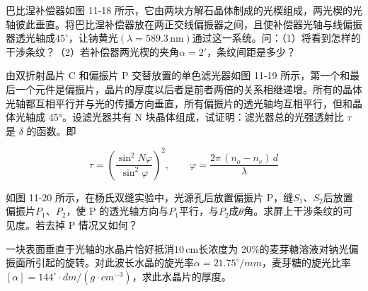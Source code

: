 \documentclass[padl, analysis, notocnum]{ExBook}
\newcommand{\answerarea}[1][3.5cm]{%
  \par\vspace{1mm}%
  \noindent{\color{themeColor!35}\rule{\linewidth}{0.4pt}}\par
  \noindent\begin{minipage}[t][#1][t]{\linewidth}\vspace{0pt}\end{minipage}\par
  \noindent{\color{themeColor!35}\rule{\linewidth}{0.4pt}}\par
}
\begin{document}
\begin{qitems}[startnum=9]
\qitem 巴比涅补偿器如图 11-18 所示，它由两块方解石晶体制成的光楔组成，两光楔的光轴彼此垂直。将巴比涅补偿器放在两正交线偏振器之间，且使补偿器光轴与线偏振器透光轴成$45^{\circ}$，让钠黄光$(\lambda =589.3\,\mathrm{nm})$通过这一系统。问：（1）将看到怎样的干涉条纹？（2）若补偿器两光楔的夹角$\alpha =2'$，条纹间距是多少？
\label{q:343:start}
\answerarea[2.4cm]
\label{q:343:end}
\end{qitems}

\begin{qitems}[startnum=10]
\qitem 由双折射晶片 C 和偏振片 P 交替放置的单色滤光器如图 11-19 所示，第一个和最后一个元件是偏振片，晶片的厚度以后者是前者两倍的关系相继递增。所有的晶体光轴都互相平行并与光的传播方向垂直，所有偏振片的透光轴均互相平行，但和晶体光轴成 45°。设滤光器共有 N 块晶体组成，试证明：滤光器总的光强透射比 $\tau$ 是 $\delta$ 的函数。即

\par\vspace{2mm}
\[
\tau=\left(\frac{\sin^{2}N\varphi}{\sin^{2}\varphi}\right)^{2},
\qquad
\varphi=\frac{2\pi\,(n_{o}-n_{e})\,d}{\lambda}
\]

\label{q:344:start}
\answerarea[2.4cm]
\label{q:344:end}
\end{qitems}

\begin{qitems}[startnum=11]
\qitem 如图 11-20 所示，在杨氏双缝实验中，光源孔后放置偏振片 P，缝$S_{1}$、$S_{2}$后放置偏振片$P_{1}$、$P_{2}$，使 P 的透光轴方向与$P_{1}$平行，与$P_{2}$成$\theta$角。求屏上干涉条纹的可见度。若去掉 P 情况又如何？
\label{q:345:start}
\answerarea[2.4cm]
\label{q:345:end}
\end{qitems}

\begin{qitems}[startnum=12]
\qitem 一块表面垂直于光轴的水晶片恰好抵消$10\,\mathrm{cm}$长浓度为 20\%的麦芽糖溶液对钠光偏振面所引起的旋转。对此波长水晶的旋光率$\alpha =21.75^{\circ}/mm$，麦芽糖的旋光比率$[\alpha ]=144^{\circ}\cdot dm/(g\cdot cm^{-3})$，求此水晶片的厚度。
\label{q:346:start}
\answerarea[7.0cm]
\label{q:346:end}
\end{qitems}
\end{document}
